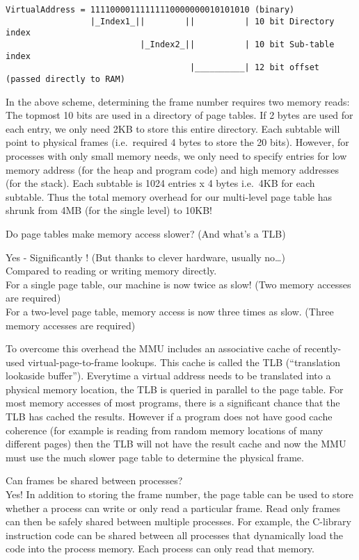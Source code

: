 \begin{verbatim}
VirtualAddress = 11110000111111110000000010101010 (binary)
                 |_Index1_||        ||          | 10 bit Directory index
                           |_Index2_||          | 10 bit Sub-table index
                                     |__________| 12 bit offset (passed directly to RAM)
\end{verbatim}

In the above scheme, determining the frame number requires two memory
reads: The topmost 10 bits are used in a directory of page tables. If 2
bytes are used for each entry, we only need 2KB to store this entire
directory. Each subtable will point to physical frames (i.e.~required 4
bytes to store the 20 bits). However, for processes with only small
memory needs, we only need to specify entries for low memory address
(for the heap and program code) and high memory addresses (for the
stack). Each subtable is 1024 entries x 4 bytes i.e.~4KB for each
subtable. Thus the total memory overhead for our multi-level page table
has shrunk from 4MB (for the single level) to 10KB!

Do page tables make memory access slower? (And what's a TLB)

Yes - Significantly ! (But thanks to clever hardware, usually
no\ldots{})\\Compared to reading or writing memory directly.\\For a
single page table, our machine is now twice as slow! (Two memory
accesses are required)\\For a two-level page table, memory access is now
three times as slow. (Three memory accesses are required)

To overcome this overhead the MMU includes an associative cache of
recently-used virtual-page-to-frame lookups. This cache is called the
TLB (``translation lookaside buffer''). Everytime a virtual address
needs to be translated into a physical memory location, the TLB is
queried in parallel to the page table. For most memory accesses of most
programs, there is a significant chance that the TLB has cached the
results. However if a program does not have good cache coherence (for
example is reading from random memory locations of many different pages)
then the TLB will not have the result cache and now the MMU must use the
much slower page table to determine the physical frame.

Can frames be shared between processes?\\Yes! In addition to storing the
frame number, the page table can be used to store whether a process can
write or only read a particular frame. Read only frames can then be
safely shared between multiple processes. For example, the C-library
instruction code can be shared between all processes that dynamically
load the code into the process memory. Each process can only read that
memory.

